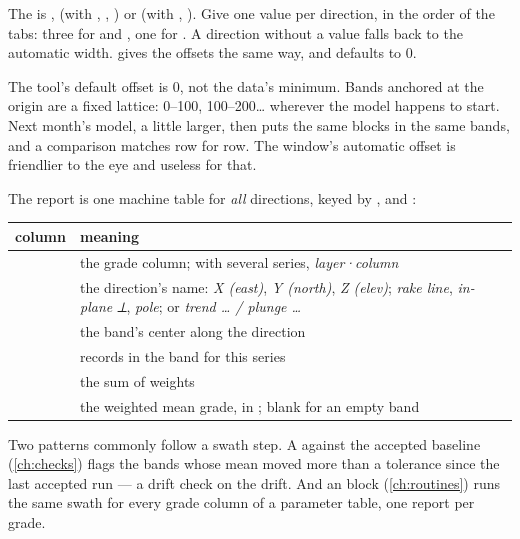 The  is ,  (with , , ) or  (with , ). Give  one value per direction, in the order of the tabs: three for  and , one for . A direction without a value falls back to the automatic width.  gives the offsets the same way, and defaults to 0.

\begin{why}
The tool's default offset is 0, not the data's minimum. Bands anchored at the origin are a fixed lattice: 0–100, 100–200… wherever the model happens to start. Next month's model, a little larger, then puts the same blocks in the same bands, and a comparison matches row for row. The window's automatic offset is friendlier to the eye and useless for that.
\end{why}

The report is one machine table for \emph{all} directions, keyed by ,  and :

\medskip
\begin{tabularx}{\linewidth}{@{}lL@{}}\toprule
column & meaning \\ \midrule
{} & the grade column; with several series, \emph{layer·column} \\
 & the direction's name: \emph{X (east)}, \emph{Y (north)}, \emph{Z (elev)}; \emph{rake line}, \emph{in-plane ⟂}, \emph{pole}; or \emph{trend … / plunge …} \\
 & the band's center along the direction \\
 & records in the band for this series \\
 & the sum of weights \\
 & the weighted mean grade, in ; blank for an empty band \\ \bottomrule
\end{tabularx}
\medskip

Two patterns commonly follow a swath step. A  against the accepted baseline (\cref{ch:checks}) flags the bands whose mean moved more than a tolerance since the last accepted run — a drift check on the drift. And an  block (\cref{ch:routines}) runs the same swath for every grade column of a parameter table, one report per grade.
